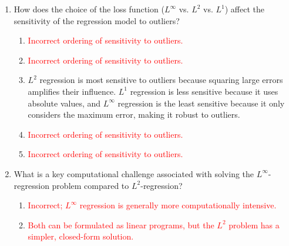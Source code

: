 \documentclass{article}%
\newcommand{\incorrect}[1]{\textcolor{red}{#1}}
\begin{document}
\begin{enumerate}
\begin{enumerate}%
\item \incorrect{This describes the objective of $L^1$-regression.}%
\item The primary objective in $L^\infty$-regression is to minimize the maximum absolute error between the predicted and actual values. This is in contrast to $L^1$ and $L^2$ regression, which minimize the sum of absolute errors and the sum of squared errors, respectively.%
\item \incorrect{This describes the objective of $L^2$-regression.}%
\item \incorrect{Minimizing the average absolute error is related to $L^1$-regression but is not the primary focus of $L^\infty$-regression.}%
\item \incorrect{Minimizing the median absolute error is a robust regression technique but is not the same as $L^\infty$-regression.}%
\end{enumerate}%
\vspace{1em}%
\item How does the choice of the loss function ($L^\infty$ vs. $L^2$ vs. $L^1$) affect the sensitivity of the regression model to outliers?%
\begin{enumerate}%
\item \incorrect{Incorrect ordering of sensitivity to outliers.}%
\item \incorrect{Incorrect ordering of sensitivity to outliers.}%
\item $L^2$ regression is most sensitive to outliers because squaring large errors amplifies their influence. $L^1$ regression is less sensitive because it uses absolute values, and $L^\infty$ regression is the least sensitive because it only considers the maximum error, making it robust to outliers.%
\item \incorrect{Incorrect ordering of sensitivity to outliers.}%
\item \incorrect{Incorrect ordering of sensitivity to outliers.}%
\end{enumerate}%
\vspace{1em}%
\item What is a key computational challenge associated with solving the $L^\infty$-regression problem compared to $L^2$-regression?%
\begin{enumerate}%
\item \incorrect{Incorrect; $L^\infty$ regression is generally more computationally intensive.}%
\item \incorrect{Both can be formulated as linear programs, but the $L^2$ problem has a simpler, closed-form solution.}%

\end{enumerate}
\end{enumerate}
\end{document}
